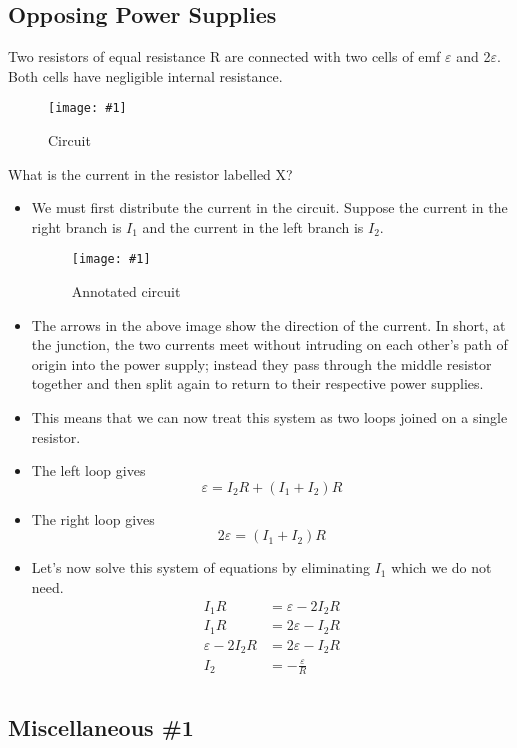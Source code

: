 \documentclass[a4paper,12pt]{article}
\newcommand{\img}[4]{\begin{center}
  \begin{figure}[H]
    \centering
    \texttt{[image: \#1]}
    \caption{#3}
    \label{fig:#4}
  \end{figure}
\end{center}}
\begin{document}
\pagebreak

\subsection{Opposing Power Supplies}

Two resistors of equal resistance R are connected with two cells of emf $\varepsilon$ and 2$\varepsilon$. Both cells have negligible internal resistance.

\img{ex/12.png}{0.5}{Circuit}{ex12}

What is the current in the resistor labelled X?

\begin{itemize}
  \item We must first distribute the current in the circuit. Suppose the current in the right branch is $I_1$ and the current in the left branch is $I_2$.
        \img{ex/13.png}{0.5}{Annotated circuit}{ex13}
  \item The arrows in the above image show the direction of the current. In short, at the junction, the two currents meet without intruding on each other's path of origin into the power supply; instead they pass through the middle resistor together and then split again to return to their respective power supplies.
  \item This means that we can now treat this system as two loops joined on a single resistor.
  \item The left loop gives
        $$\varepsilon = I_2R + (I_1 + I_2)R$$
  \item The right loop gives
        $$2\varepsilon = (I_1 + I_2)R$$
  \item Let's now solve this system of equations by eliminating $I_1$ which we do not need.
        \begin{align*}
          I_1R                & = \varepsilon - 2I_2R    \\
          I_1R                & = 2\varepsilon - I_2R    \\
          \varepsilon - 2I_2R & = 2\varepsilon - I_2R    \\
          I_2                 & = -\frac{\varepsilon}{R} \\
        \end{align*}
\end{itemize}

\pagebreak

\subsection{Miscellaneous \#1}
\end{document}
